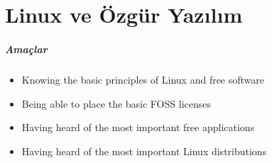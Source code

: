 \documentclass[10pt,a5paper]{book}
\begin{document}
\chapter{Linux ve Özgür Yazılım}
\paragraph{Amaçlar}
\begin{itemize}
 \item Knowing the basic principles of Linux and free software
 \item Being able to place the basic FOSS licenses
 \item Having heard of the most important free applications
 \item Having heard of the most important Linux distributions
 \end{itemize}
 
\end{document}
